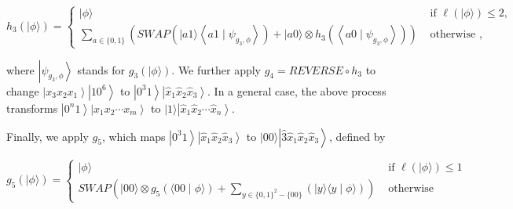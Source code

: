 \documentclass[10pt]{article}
\begin{document}
$$
h_{3}(|\phi\rangle)= \begin{cases}|\phi\rangle & \text { if } \ell(|\phi\rangle) \leq 2, \\ \sum_{a \in\{0,1\}}\left(S W A P\left(|a 1\rangle\left\langle a 1 \mid \psi_{g_{3}, \phi}\right\rangle\right)+|a 0\rangle \otimes h_{3}\left(\left\langle a 0 \mid \psi_{g_{3}, \phi}\right\rangle\right)\right) & \text { otherwise },\end{cases}
$$

where $\left|\psi_{g_{3}, \phi}\right\rangle$ stands for $g_{3}(|\phi\rangle)$. We further apply $g_{4}=R E V E R S E \circ h_{3}$ to change $\left|x_{3} x_{2} x_{1}\right\rangle\left|10^{6}\right\rangle$ to $\left|0^{3} 1\right\rangle\left|\hat{x}_{1} \hat{x}_{2} \hat{x}_{3}\right\rangle$. In a general case, the above process transforms $\left|0^{n} 1\right\rangle\left|x_{1} x_{2} \cdots x_{m}\right\rangle$ to $|1\rangle\left|\hat{x}_{1} \hat{x}_{2} \cdots \hat{x}_{n}\right\rangle$.

Finally, we apply $g_{5}$, which maps $\left|0^{3} 1\right\rangle\left|\hat{x}_{1} \hat{x}_{2} \hat{x}_{3}\right\rangle$ to $|00\rangle\left|\hat{3} \hat{x}_{1} \hat{x}_{2} \hat{x}_{3}\right\rangle$, defined by

$$
g_{5}(|\phi\rangle)= \begin{cases}|\phi\rangle & \text { if } \ell(|\phi\rangle) \leq 1 \\ S W A P\left(|00\rangle \otimes g_{5}(\langle 00 \mid \phi\rangle)+\sum_{y \in\{0,1\}^{2}-\{00\}}(|y\rangle\langle y \mid \phi\rangle)\right) & \text { otherwise }\end{cases}
$$
\end{document}
